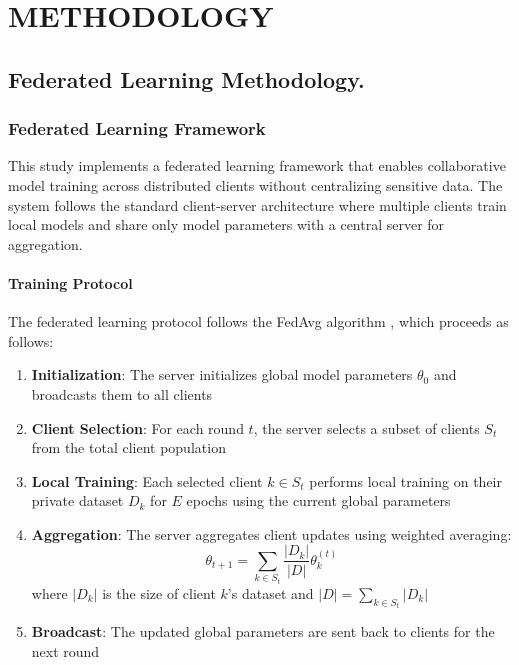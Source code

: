 \documentclass[a4paper, 10 pt, conference]{ieeeconf}
\begin{document}
\section{METHODOLOGY}

\subsection{Federated Learning Methodology.}



\subsubsection{Federated Learning Framework}

This study implements a federated learning framework that enables collaborative model training across distributed clients without centralizing sensitive data. The system follows the standard client-server architecture where multiple clients train local models and share only model parameters with a central server for aggregation.

\paragraph{Training Protocol}
The federated learning protocol follows the FedAvg algorithm \cite{mcmahan2017communication}, which proceeds as follows:

\begin{enumerate}
    \item \textbf{Initialization}: The server initializes global model parameters $\theta_0$ and broadcasts them to all clients
    \item \textbf{Client Selection}: For each round $t$, the server selects a subset of clients $S_t$ from the total client population
    \item \textbf{Local Training}: Each selected client $k \in S_t$ performs local training on their private dataset $D_k$ for $E$ epochs using the current global parameters
    \item \textbf{Aggregation}: The server aggregates client updates using weighted averaging:
    \begin{equation}
        \theta_{t+1} = \sum_{k \in S_t} \frac{|D_k|}{|D|} \theta_k^{(t)}
    \end{equation}
    where $|D_k|$ is the size of client $k$'s dataset and $|D| = \sum_{k \in S_t} |D_k|$
    \item \textbf{Broadcast}: The updated global parameters are sent back to clients for the next round
\end{enumerate}
\end{document}

